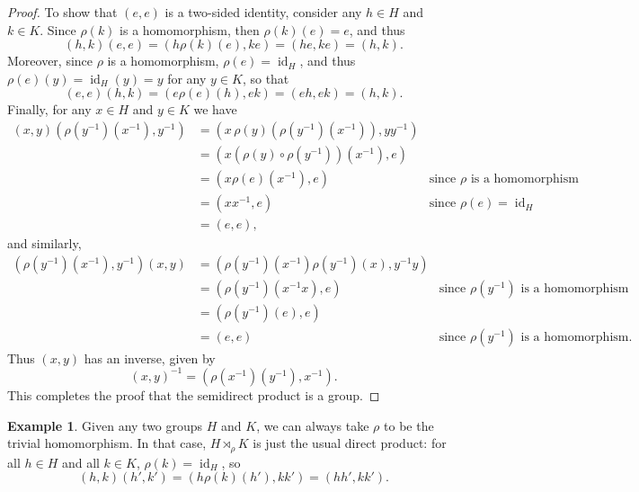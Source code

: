 \documentclass[12pt]{report}
\numberwithin{equation}{section}
\numberwithin{theorem}{chapter}
\theoremstyle{definition}
\newtheorem{example}[theorem]{Example}
\newtheorem*{basic properties}{Basic Properties}
\newtheorem*{Important Remark}{Important Remark}
\def\sdp{\rtimes}
\DeclareMathOperator{\id}{id}
\begin{document}
\begin{proof}
To show that $(e,e)$ is a two-sided identity, consider any $h \in H$ and $k \in K$. Since $\rho(k)$ is a homomorphism, then $\rho(k)(e) = e$, and thus
$$(h,k)(e,e) = (h\rho(k)(e),ke) = (he,ke) = (h,k).$$
Moreover, since $\rho$ is a homomorphism, $\rho(e) = \id_H$, and thus $\rho(e)(y) = \id_H(y)=y$ for any $y \in K$, so that
$$(e,e)(h,k) = (e\rho(e)(h),ek) = (eh,ek)=(h,k).$$
Finally, for any $x \in H$ and $y \in K$ we have
%
$$\begin{aligned}
(x,y) (\rho(y^{-1})(x^{-1}), y^{-1}) &= (x \, \rho(y)\left(\rho(y^{-1})(x^{-1}) \right), yy^{-1})\\
& = (x (\rho(y) \circ \rho(y^{-1}))(x^{-1}), e) \\
&= (x \rho(e)(x^{-1}), e) & \textrm{since $\rho$ is a homomorphism} \\
& = (xx^{-1},e) & \text{since } \rho(e) = \id_H\\ 
& =(e,e),
\end{aligned}$$
and similarly,
$$\begin{aligned}
(\rho(y^{-1})(x^{-1}), y^{-1}) (x,y) &= (\rho(y^{-1})(x^{-1}) \rho(y^{-1})(x),y^{-1}y) \\
& = (\rho(y^{-1})(x^{-1}x), e) & \textrm{since } \rho(y^{-1}) \text{ is a homomorphism} \\
& = (\rho(y^{-1})(e), e) \\
& = (e, e) & \textrm{since } \rho(y^{-1}) \text{ is a homomorphism.} 
\end{aligned}$$
Thus $(x,y)$ has an inverse, given by
$$(x,y)^{-1} = (\rho(x^{-1})(y^{-1}) ,x^{-1}).$$
This completes the proof that the semidirect product is a group.
\end{proof}




\begin{example}\label{semidirect product is direct if trivial}
Given any two groups $H$ and $K$, we can always take $\rho$ to be the trivial homomorphism. In that case, $H \sdp_\rho K$ is just the usual direct product: for all $h \in H$ and all $k \in K$, $\rho(k) = \id_H$, so
$$(h,k)(h',k') = (h\rho(k)(h'),kk') = (hh',kk').$$
\end{example}
\end{document}
